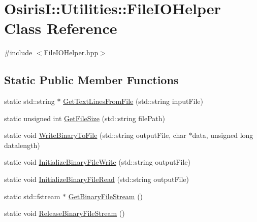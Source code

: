 \hypertarget{class_osiris_i_1_1_utilities_1_1_file_i_o_helper}{\section{Osiris\-I\-:\-:Utilities\-:\-:File\-I\-O\-Helper Class Reference}
\label{class_osiris_i_1_1_utilities_1_1_file_i_o_helper}
}


{\ttfamily \#include $<$File\-I\-O\-Helper.\-hpp$>$}

\subsection*{Static Public Member Functions}
\begin{DoxyCompactItemize}
\item 
static std\-::string $\ast$ \hyperlink{class_osiris_i_1_1_utilities_1_1_file_i_o_helper_a255218fba9094c74395e0e4d205ea4b2}{Get\-Text\-Lines\-From\-File} (std\-::string input\-File)
\item 
static unsigned int \hyperlink{class_osiris_i_1_1_utilities_1_1_file_i_o_helper_aeb85f556b85362cd4a420c600ed67d06}{Get\-File\-Size} (std\-::string file\-Path)
\item 
static void \hyperlink{class_osiris_i_1_1_utilities_1_1_file_i_o_helper_a4edc968eed2d89757f1b74ff680941d1}{Write\-Binary\-To\-File} (std\-::string output\-File, char $\ast$data, unsigned long datalength)
\item 
static void \hyperlink{class_osiris_i_1_1_utilities_1_1_file_i_o_helper_a58df34ed0da2453f3ccdb7ebd7aaa9f3}{Initialize\-Binary\-File\-Write} (std\-::string output\-File)
\item 
static void \hyperlink{class_osiris_i_1_1_utilities_1_1_file_i_o_helper_acaa2e0a7e2d94335e91509a710a3bda4}{Initialize\-Binary\-File\-Read} (std\-::string output\-File)
\item 
static std\-::fstream $\ast$ \hyperlink{class_osiris_i_1_1_utilities_1_1_file_i_o_helper_af282fa9e9c1e845fbbeb477a2247348a}{Get\-Binary\-File\-Stream} ()
\item 
static void \hyperlink{class_osiris_i_1_1_utilities_1_1_file_i_o_helper_a94ce005d4f240aaec80e207ddd6f6dc2}{Release\-Binary\-File\-Stream} ()
\end{DoxyCompactItemize}


